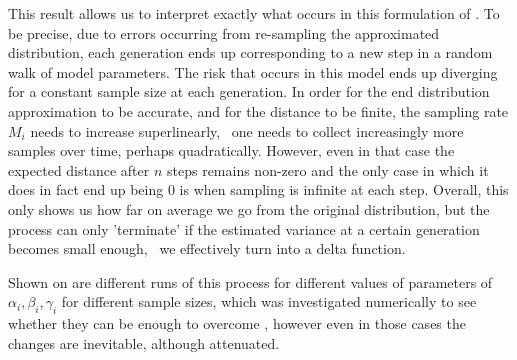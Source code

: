 This result allows us to interpret exactly what occurs in this formulation of \md. To be precise, due to errors occurring from re-sampling the approximated distribution, each generation ends up corresponding to a new step in a random walk of model parameters. The risk that occurs in this model ends up diverging for a constant sample size at each generation. In order for the end distribution approximation to be accurate, and for the distance to be finite, the sampling rate $M_i$ needs to increase superlinearly, \ie~one needs to collect increasingly more samples over time, perhaps quadratically. However, even in that case the expected distance after $n$ steps remains non-zero and the only case in which it does in fact end up being $0$ is when sampling is infinite at each step. Overall, this only shows us how far on average we go from the original distribution, but the process can only 'terminate' if the estimated variance at a certain generation becomes small enough, \ie~we effectively turn into a delta function. 

Shown on  are different runs of this process for different values of parameters of $\alpha_i, \beta_i, \gamma_i$ for different sample sizes, which was investigated numerically to see whether they can be enough to overcome \md, however even in those cases the changes are inevitable, although attenuated.


